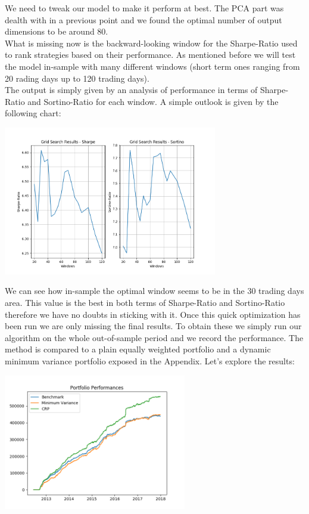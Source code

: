 We need to tweak our model to make it perform at best. The PCA part was dealth with in a previous point and we found the optimal number of output dimensions to be around 80.\\
What is missing now is the backward-looking window for the Sharpe-Ratio used to rank strategies based on their performance. As mentioned before we will test the model in-sample with many different windows (short term ones ranging from 20 rading days up to 120 trading days).\\
The output is simply given by an analysis of performance in terms of Sharpe-Ratio and Sortino-Ratio for each window. A simple outlook is given by the following chart:

\begin{center}
	\centering
	\includegraphics[width=0.7\textwidth]{HRP/CRP_Optimization.png}
	\label{CRP_Optimization}
\end{center}

We can see how in-sample the optimal window seems to be in the 30 trading days area. This value is the best in both terms of Sharpe-Ratio and Sortino-Ratio therefore we have no doubts in sticking with it. Once this quick optimization has been run we are only missing the final results. To obtain these we simply run our algorithm on the whole out-of-sample period and we record the performance. The method is compared to a plain equally weighted portfolio and a dynamic minimum variance portfolio exposed in the Appendix. Let's explore the results:

\begin{center}
	\centering
	\includegraphics[width=0.6\textwidth]{HRP/OOS_Equity_Line.png}
	\label{CRP_Equity_LIne}
\end{center}

